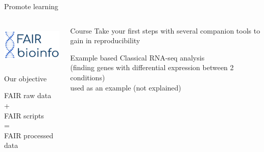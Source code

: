 \begin{frame}{Promote learning}  
  \begin{columns}
    \begin{column}{.3\textwidth}
     \includegraphics[height=2cm]{shared/FAIR_logo.png}
     \begin{block}{Our objective}
       \begin{center}
       FAIR raw data\\
       +\\
       FAIR scripts\\
       =\\
       FAIR processed data
       \end{center}
     \end{block}
    \end{column}
    \begin{column}{.55\textwidth}
    \begin{block}{Course}
    Take your first steps with several companion tools to gain in reproducibility
    \end{block}
     \begin{block}{Example based}
       Classical RNA-seq analysis\\(finding genes with differential expression between 2 conditions)\\used as an example (not explained)
     \end{block}
    \end{column}
  \end{columns}
\end{frame}